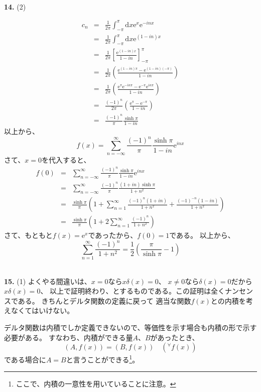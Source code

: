 \documentclass{jarticle}
\newcommand{\diff}{\mathrm d}
\newcommand{\ans}[2]{\noindent\\ {\bf \large #1.} (#2)}
\newcommand{\e}{\mathrm e}
\begin{document}
\ans{14}{2}

\begin{eqnarray}
  c_n &=& \frac{1}{2\pi} \int_{-\pi}^{\pi} \diff x \e^x \e^{-inx} \\
  &=& \frac{1}{2\pi} \int_{-\pi}^{\pi} \diff x \e^{(1-in)x} \\
  &=& \frac{1}{2\pi} \left[ \frac{\e^{(1-in)x}}{1-in}  \right]_{-\pi}^{\pi}\\
  &=& \frac{1}{2\pi} \left( \frac{\e^{(1-in)\pi} - \e^{(1-in)(-\pi) }}{1-in}  \right)\\
  &=& \frac{1}{2\pi} \left( \frac{ \e^\pi \e^{-in\pi} - \e^{-\pi} \e^{in\pi} }{1-in}  \right)\\
  &=& \frac{(-1)^n}{2\pi} \left( \frac{\e^{\pi} - \e^{-\pi} }{1-in}  \right)\\
  &=& \frac{(-1)^n}{\pi} \frac{\sinh \pi }{1-in}
\end{eqnarray}
以上から、
\begin{equation}
  f(x) = \sum_{n=-\infty}^{\infty} \frac{(-1)^n}{\pi} \frac{\sinh \pi }{1-in} \e^{inx}
\end{equation}
さて、$x=0$を代入すると、
\begin{eqnarray}
  f(0) &=& \sum_{n=-\infty}^{\infty} \frac{(-1)^n}{\pi} \frac{\sinh \pi }{1-in} \e^{inx}\\
  &=& \sum_{n=-\infty}^{\infty} \frac{(-1)^n}{\pi} \frac{(1+in) \sinh \pi }{1+n^2}\\
  &=& \frac{\sinh \pi}{\pi}\left( 1+  \sum_{n=1}^{\infty}\frac{(-1)^n(1+in)}{1+n^2}+\frac{(-1)^{-n}(1-in)}{1+n^2}  \right)\\
  &=& \frac{\sinh \pi}{\pi}\left( 1+  2 \sum_{n=1}^{\infty} \frac{(-1)^n}{1+n^2} \right)
\end{eqnarray}
さて、もともと$f(x)=\e^x$であったから、$f(0)=1$である。
以上から、
\begin{equation}
  \sum_{n=1}^{\infty} \frac{(-1)^n}{1+n^2} = \frac{1}{2} \left( \frac{\pi}{\sinh \pi} -1 \right)
\end{equation}

\ans{15}{1}
よくやる間違いは、$x = 0$なら$x \delta(x) = 0$、
$x \neq 0$なら$\delta(x) = 0$だから$x \delta(x) = 0$、
以上で証明終わり、とするものである。この証明は全くナンセンスである。
きちんとデルタ関数の定義に戻って
適当な関数$f(x)$との内積を考えなくてはいけない。

デルタ関数は内積でしか定義できないので、等価性を示す場合も内積の形で示す必要がある。
すなわち、内積ができる量$A$、$B$があったとき、
\begin{equation}
  (A,f(x)) = (B,f(x)) \quad \left( ^\forall f(x) \right)
\end{equation}
である場合に$A=B$と言うことができる\footnote{%
  ここで、内積の一意性を用いていることに注意。
}。
\end{document}
